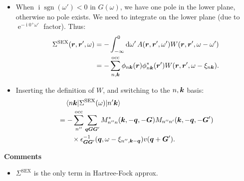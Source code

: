 \documentclass[t]{beamer}
\DeclareMathOperator{\ee}{e}
\DeclareMathOperator{\ii}{i}
\DeclareMathOperator{\sgn}{sgn}
\begin{document}
\begin{frame}[allowframebreaks]
\begin{itemize}
    \item When $\ii \sgn(\omega') < 0$ in $G(\omega)$,
        we have one pole in the lower plane, 
        otherwise no pole exists. 
        We need to integrate on the lower plane 
        (due to $\ee^{- \ii 0^+ \omega'}$ factor). Thus:
        \begin{equation}
            \begin{aligned}
                \Sigma^{\text{SEX}}(\vb*{r}, \vb*{r}', \omega) 
                &= - \int^0_{-\infty} \dd{\omega'} A(\vb*{r}, \vb*{r}', \omega') 
                W(\vb*{r}, \vb*{r}', \omega - \omega') \\
                &= - \sum_{n, \vb*{k}}^{\text{occ}}
                \phi_{n \vb*{k}}(\vb*{r}) \phi_{n \vb*{k}}^*(\vb*{r}') 
                W(\vb*{r}, \vb*{r}', \omega - \xi_{n \vb*{k}}).
            \end{aligned}
        \end{equation}
    \item Inserting the definition of $W$, 
        and switching to the $n, \vb*{k}$ basis: 
        \begin{equation}
            \begin{aligned}
                &\quad \mel{n \vb*{k}}{\Sigma^{\text{SEX}}(\omega)}{n' \vb*{k}} \\
                &= - \sum_{n''}^{\text{occ}} \sum_{\vb*{q} \vb*{G} \vb*{G}'}
                M^*_{n'' n} (\vb*{k}, - \vb*{q}, - \vb*{G}) M_{n'' n'} (\vb*{k}, - \vb*{q},  -\vb*{G}') \\
                &\quad\quad \times  \epsilon^{-1}_{\vb*{G} \vb*{G}'}(\vb*{q}, \omega - \xi_{n'', \vb*{k} - \vb*{q}}) 
                v(\vb*{q} + \vb*{G}') .
            \end{aligned}
            \label{eq:sex}
        \end{equation}
\end{itemize}

\textbf{Comments}

\begin{itemize}
    \item $\Sigma^{\text{SEX}}$ is the only term in Hartree-Fock approx. 
\end{itemize}

\framebreak


\end{frame}
\end{document}
